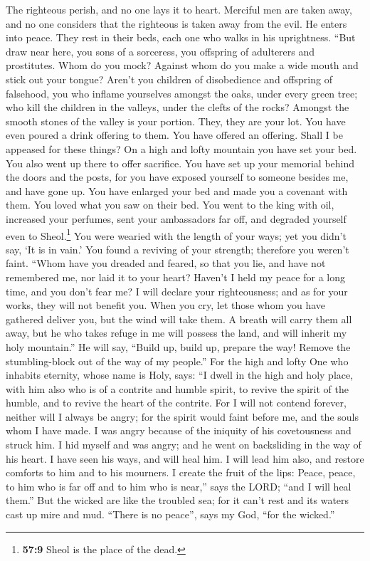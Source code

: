  The righteous perish, and no one lays it to heart.
Merciful men are taken away, and no one considers that the righteous is
taken away from the evil.  He enters into peace. They rest
in their beds, each one who walks in his uprightness. 
``But draw near here, you sons of a sorceress, you offspring of
adulterers and prostitutes.  Whom do you mock? Against
whom do you make a wide mouth and stick out your tongue? Aren't you
children of disobedience and offspring of falsehood,  you
who inflame yourselves amongst the oaks, under every green tree; who
kill the children in the valleys, under the clefts of the rocks?
 Amongst the smooth stones of the valley is your portion.
They, they are your lot. You have even poured a drink offering to them.
You have offered an offering. Shall I be appeased for these things?
 On a high and lofty mountain you have set your bed. You
also went up there to offer sacrifice.  You have set up
your memorial behind the doors and the posts, for you have exposed
yourself to someone besides me, and have gone up. You have enlarged your
bed and made you a covenant with them. You loved what you saw on their
bed.  You went to the king with oil, increased your
perfumes, sent your ambassadors far off, and degraded yourself even to
Sheol.\footnote{\textbf{57:9} Sheol is the place of the dead.}
 You were wearied with the length of your ways; yet you
didn't say, `It is in vain.' You found a reviving of your strength;
therefore you weren't faint.  ``Whom have you dreaded and
feared, so that you lie, and have not remembered me, nor laid it to your
heart? Haven't I held my peace for a long time, and you don't fear me?
 I will declare your righteousness; and as for your
works, they will not benefit you.  When you cry, let
those whom you have gathered deliver you, but the wind will take them. A
breath will carry them all away, but he who takes refuge in me will
possess the land, and will inherit my holy mountain.'' 
He will say, ``Build up, build up, prepare the way! Remove the
stumbling-block out of the way of my people.''  For the
high and lofty One who inhabits eternity, whose name is Holy, says: ``I
dwell in the high and holy place, with him also who is of a contrite and
humble spirit, to revive the spirit of the humble, and to revive the
heart of the contrite.  For I will not contend forever,
neither will I always be angry; for the spirit would faint before me,
and the souls whom I have made.  I was angry because of
the iniquity of his covetousness and struck him. I hid myself and was
angry; and he went on backsliding in the way of his heart.
 I have seen his ways, and will heal him. I will lead him
also, and restore comforts to him and to his mourners.  I
create the fruit of the lips: Peace, peace, to him who is far off and to
him who is near,'' says the LORD; ``and I will heal them.''
 But the wicked are like the troubled sea; for it can't
rest and its waters cast up mire and mud.  ``There is no
peace'', says my God, ``for the wicked.''


